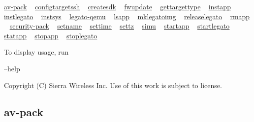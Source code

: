 \hyperlink{toolsHost_av-pack}{av-\/pack} ~\newline
 \hyperlink{toolsHost_configtargetssh}{configtargetssh} ~\newline
 \hyperlink{toolsHost_createsdk}{createsdk} ~\newline
 \hyperlink{toolsHost_fwupdate}{fwupdate} ~\newline
 \hyperlink{toolsHost_gettargettype}{gettargettype} ~\newline
 \hyperlink{toolsHost_instapp}{instapp} ~\newline
 \hyperlink{toolsHost_instlegato}{instlegato} ~\newline
 \hyperlink{toolsHost_instsys}{instsys} ~\newline
 \hyperlink{toolsHost_legato-qemu}{legato-\/qemu} ~\newline
 \hyperlink{toolsHost_lsapp}{lsapp} ~\newline
 \hyperlink{toolsHost_mklegatoimg}{mklegatoimg} ~\newline
 \hyperlink{toolsHost_releaselegato}{releaselegato} ~\newline
 \hyperlink{toolsHost_rmapp}{rmapp} ~\newline
 \hyperlink{toolsHost_security-pack}{security-\/pack} ~\newline
 \hyperlink{toolsHost_setname}{setname} ~\newline
 \hyperlink{toolsHost_settime}{settime} ~\newline
 \hyperlink{toolsHost_settz}{settz} ~\newline
 \hyperlink{toolsHost_simu}{simu} ~\newline
 \hyperlink{toolsHost_startapp}{startapp} ~\newline
 \hyperlink{toolsHost_startlegato}{startlegato} ~\newline
 \hyperlink{toolsHost_statapp}{statapp} ~\newline
 \hyperlink{toolsHost_stopapp}{stopapp} ~\newline
 \hyperlink{toolsHost_stoplegato}{stoplegato} ~\newline


To display usage, run \begin{DoxyVerb}[toolname] --help \end{DoxyVerb}






Copyright (C) Sierra Wireless Inc. Use of this work is subject to license. \hypertarget{toolsHost_av-pack}{}\subsection{av-\/pack}\label{toolsHost_av-pack}
